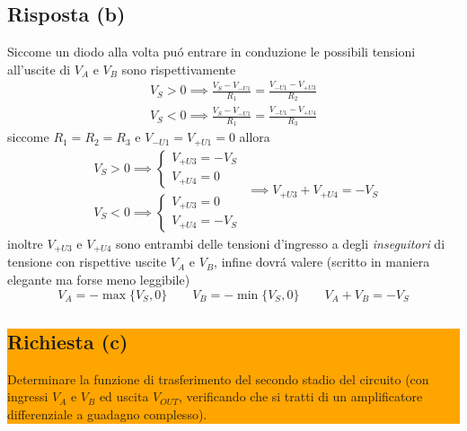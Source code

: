 \subsection*{Risposta (b)}
Siccome un diodo alla volta pu\'o entrare in conduzione le possibili tensioni all'uscite
di $V_A$ e $V_B$ sono rispettivamente
\begin{equation*}
  \begin{gathered}
    V_S > 0 \implies \frac{V_S - V_{-U1}}{R_1} = \frac{V_{-U1} - V_{+U3}}{R_2} \\
    V_S < 0 \implies \frac{V_S - V_{-U1}}{R_1} = \frac{V_{-U1} - V_{+U4}}{R_3}
  \end{gathered}
\end{equation*}
siccome $R_1 = R_2 = R_3$ e $V_{-U1} = V_{+U1} = 0$ allora
\begin{equation*}
  \begin{gathered}
    V_S > 0 \implies
    \begin{cases}
      V_{+U3} = -V_S \\
      V_{+U4} = 0
    \end{cases} \\
    V_S < 0 \implies
    \begin{cases}
      V_{+U3} = 0 \\
      V_{+U4} = -V_S
    \end{cases}
  \end{gathered} \implies
  V_{+U3} + V_{+U4} = -V_S
\end{equation*}
inoltre $V_{+U3}$ e $V_{+U4}$ sono entrambi delle tensioni d'ingresso a degli \textit{inseguitori}
di tensione con rispettive uscite $V_A$ e $V_B$, infine dovr\'a valere (scritto in maniera elegante
ma forse meno leggibile)
\begin{equation*}
  V_A = -\max\{V_S, 0\} \qquad V_B = -\min\{V_S, 0\} \qquad V_A + V_B = -V_S
\end{equation*}

\noindent\colorbox{orange}{
  \begin{minipage}{1.0\linewidth}
    \subsection*{Richiesta (c)}
    Determinare la funzione di trasferimento del secondo stadio del circuito (con ingressi $V_A$ e
    $V_B$ ed uscita $V_{OUT}$, verificando che si tratti di un amplificatore differenziale a guadagno
    complesso).
  \end{minipage}
}
